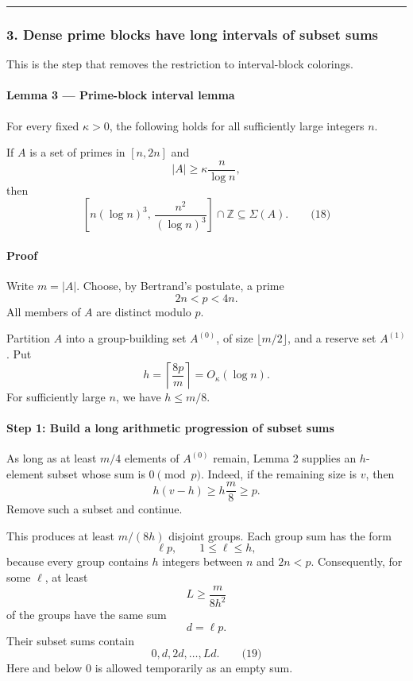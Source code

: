 \documentclass[
  11pt,
  a4paper,
]{article}
\begin{document}
\begin{center}\rule{0.5\linewidth}{0.5pt}\end{center}

\subsubsection{3. Dense prime blocks have long intervals of subset
sums}\label{dense-prime-blocks-have-long-intervals-of-subset-sums}

This is the step that removes the restriction to interval-block
colorings.

\paragraph{Lemma 3 --- Prime-block interval
lemma}\label{lemma-3-prime-block-interval-lemma}

For every fixed \(\kappa>0\), the following holds for all sufficiently
large integers \(n\).

If \(A\) is a set of primes in \([n,2n]\) and \[
|A|\ge \kappa\frac{n}{\log n},
\] then \[
\left[n(\log n)^3,\,
\frac{n^2}{(\log n)^3}\right]\cap\mathbb Z
\subseteq\Sigma(A).
\qquad\text{(18)}
\]

\paragraph{Proof}\label{proof-2}

Write \(m=|A|\). Choose, by Bertrand's postulate, a prime \[
2n<p<4n.
\] All members of \(A\) are distinct modulo \(p\).

Partition \(A\) into a group-building set \(A^{(0)}\), of size
\(\lfloor m/2\rfloor\), and a reserve set \(A^{(1)}\). Put \[
h=\left\lceil\frac{8p}{m}\right\rceil
=O_\kappa(\log n).
\] For sufficiently large \(n\), we have \(h\le m/8\).

\paragraph{Step 1: Build a long arithmetic progression of subset
sums}\label{step-1-build-a-long-arithmetic-progression-of-subset-sums}

As long as at least \(m/4\) elements of \(A^{(0)}\) remain, Lemma 2
supplies an \(h\)-element subset whose sum is \(0\pmod p\). Indeed, if
the remaining size is \(v\), then \[
h(v-h)\ge h\frac m8\ge p.
\] Remove such a subset and continue.

This produces at least \(m/(8h)\) disjoint groups. Each group sum has
the form \[
\ell p,\qquad 1\le\ell\le h,
\] because every group contains \(h\) integers between \(n\) and
\(2n<p\). Consequently, for some \(\ell\), at least \[
L\ge \frac{m}{8h^2}
\] of the groups have the same sum \[
d=\ell p.
\] Their subset sums contain \[
0,d,2d,\ldots,Ld.
\qquad\text{(19)}
\] Here and below \(0\) is allowed temporarily as an empty sum.
\end{document}
